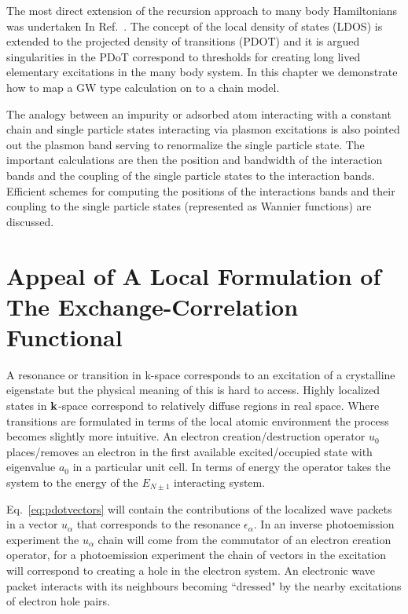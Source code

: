 The most direct extension of the recursion approach to many body Hamiltonians 
was undertaken In Ref.~\cite{annett94}. The concept of the local density of states (LDOS)
is extended to the projected density of transitions (PDOT) and it is argued singularities
in the PDoT correspond to thresholds for creating long lived elementary excitations 
in the many body system. In this chapter we demonstrate how to map a GW type calculation
on to a chain model. 

The analogy between an impurity or adsorbed atom interacting with
a constant chain and single particle states interacting via plasmon excitations is 
also pointed out the plasmon band serving to renormalize the single particle state.
The important calculations are then the position and bandwidth of the interaction
bands and the coupling of the single particle states to the interaction bands.
Efficient schemes for computing the positions of the interactions bands and 
their coupling to the single particle states (represented as Wannier functions)
are discussed.

\section{Appeal of A Local Formulation of The Exchange-Correlation Functional}
A resonance or transition in k-space corresponds to an excitation 
of a crystalline eigenstate but the physical meaning of this is hard to access. Highly
localized states in ${\bf k}$-space correspond to relatively diffuse regions in real space. Where
transitions are formulated in terms of the local atomic environment the process becomes slightly
more intuitive. An electron creation/destruction operator $u_{0}$ places/removes an electron in the 
first available excited/occupied state with eigenvalue $a_{0}$ in a particular unit cell. 
In terms of energy the operator takes the system to the energy 
of the $E_{N\pm1}$ interacting system. 

Eq.~\ref{eq:pdotvectors} will contain the contributions of the localized
wave packets in a vector $u_{\alpha}$ that corresponds to the resonance 
$\epsilon_{\alpha}$. In an inverse photoemission experiment the $u_{\alpha}$ chain
will come from the commutator of an electron creation operator, for a photoemission
experiment the chain of vectors in the excitation will correspond to creating a hole
in the electron system. An electronic wave packet interacts with its neighbours becoming
``dressed" by the nearby excitations of electron hole pairs. 


